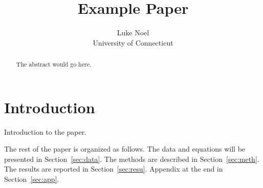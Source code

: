 \documentclass[12pt]{article}
\title{Example Paper}
\author{Luke Noel\\
  University of Connecticut
}
\begin{document}
\maketitle

\begin{abstract}
The abstract would go here. 
\end{abstract}

\section{Introduction}
\label{sec:intro}
Introduction to the paper.

The rest of the paper is organized as follows.
The data and equations will be presented in Section~\ref{sec:data}.
The methods are described in Section~\ref{sec:meth}.
The results are reported in Section~\ref{sec:resu}.
Appendix at the end in Section~\ref{sec:app}.
\end{document}
